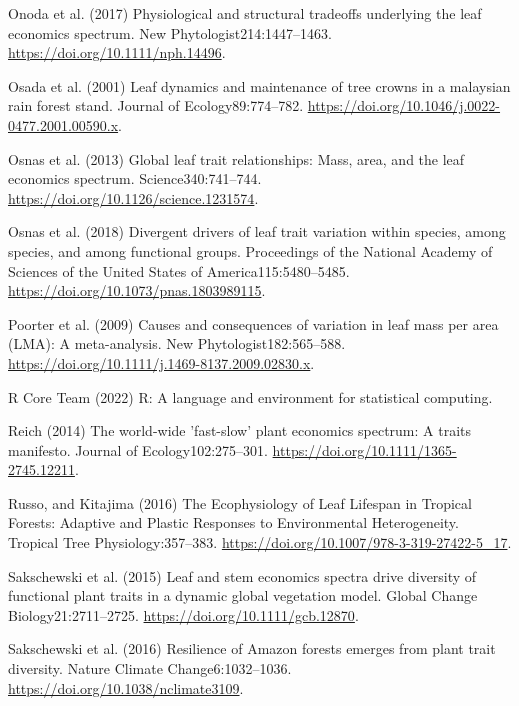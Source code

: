 \documentclass[
  12pt,
  letterpaper,
  DIV=11,
  numbers=noendperiod]{scrartcl}
\newlength{\cslhangindent}
\newenvironment{CSLReferences}[2] %
 {\begin{list}{}{%
  \setlength{\itemindent}{0pt}
  \setlength{\leftmargin}{0pt}
  \setlength{\parsep}{0pt}
  \ifodd #1
   \setlength{\leftmargin}{\cslhangindent}
   \setlength{\itemindent}{-1\cslhangindent}
  \fi
  \setlength{\itemsep}{#2\baselineskip}}}
 {\end{list}}
\begin{document}
\begin{CSLReferences}{1}{1}
Onoda et al. (2017) Physiological and structural tradeoffs underlying
the leaf economics spectrum. New Phytologist214:1447--1463.
\url{https://doi.org/10.1111/nph.14496}.

Osada et al. (2001) Leaf dynamics and maintenance of tree crowns in a
malaysian rain forest stand. Journal of Ecology89:774--782.
\url{https://doi.org/10.1046/j.0022-0477.2001.00590.x}.

Osnas et al. (2013) Global leaf trait relationships: {Mass}, area, and
the leaf economics spectrum. Science340:741--744.
\url{https://doi.org/10.1126/science.1231574}.

Osnas et al. (2018) Divergent drivers of leaf trait variation within
species, among species, and among functional groups. Proceedings of the
National Academy of Sciences of the United States of
America115:5480--5485. \url{https://doi.org/10.1073/pnas.1803989115}.

Poorter et al. (2009) Causes and consequences of variation in leaf mass
per area ({LMA}): {A} meta-analysis. New Phytologist182:565--588.
\url{https://doi.org/10.1111/j.1469-8137.2009.02830.x}.

R Core Team (2022) R: {A} language and environment for statistical
computing.

Reich (2014) The world-wide 'fast-slow' plant economics spectrum: {A}
traits manifesto. Journal of Ecology102:275--301.
\url{https://doi.org/10.1111/1365-2745.12211}.

Russo, and Kitajima (2016) The {Ecophysiology} of {Leaf Lifespan} in
{Tropical Forests}: {Adaptive} and {Plastic Responses} to {Environmental
Heterogeneity}. Tropical {Tree Physiology}:357--383.
\url{https://doi.org/10.1007/978-3-319-27422-5_17}.

Sakschewski et al. (2015) Leaf and stem economics spectra drive
diversity of functional plant traits in a dynamic global vegetation
model. Global Change Biology21:2711--2725.
\url{https://doi.org/10.1111/gcb.12870}.

Sakschewski et al. (2016) Resilience of {Amazon} forests emerges from
plant trait diversity. Nature Climate Change6:1032--1036.
\url{https://doi.org/10.1038/nclimate3109}.


\end{CSLReferences}
\end{document}

